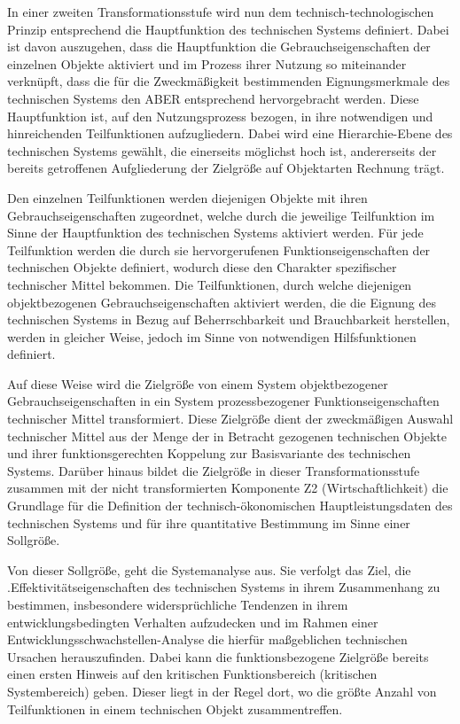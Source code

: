 \documentclass[12pt,a4paper]{article}
\begin{document}
In einer zweiten Transformationsstufe wird nun dem technisch-technologischen
Prinzip entsprechend die Hauptfunktion des technischen Systems
definiert. Dabei ist davon auszugehen, dass die Hauptfunktion die
Gebrauchseigenschaften der einzelnen Objekte aktiviert und im Prozess ihrer
Nutzung so miteinander verknüpft, dass die für die Zweckmäßigkeit bestimmenden
Eignungsmerkmale des technischen Systems den ABER entsprechend hervorgebracht
werden. Diese Hauptfunktion ist, auf den Nutzungsprozess bezogen, in ihre
notwendigen und hinreichenden Teilfunktionen aufzugliedern. Dabei wird eine
Hierarchie-Ebene des technischen Systems gewählt, die einerseits möglichst
hoch ist, andererseits der bereits getroffenen Aufgliederung der Zielgröße auf
Objektarten Rechnung trägt.

Den einzelnen Teilfunktionen werden diejenigen Objekte mit ihren
Gebrauchseigenschaften zugeordnet, welche durch die jeweilige Teilfunktion im
Sinne der Hauptfunktion des technischen Systems aktiviert werden. Für jede
Teilfunktion werden die durch sie hervorgerufenen Funktionseigenschaften der
technischen Objekte definiert, wodurch diese den Charakter spezifischer
technischer Mittel bekommen. Die Teilfunktionen, durch welche diejenigen
objektbezogenen Gebrauchseigenschaften aktiviert werden, die die Eignung des
technischen Systems in Bezug auf Beherrschbarkeit und Brauchbarkeit
herstellen, werden in gleicher Weise, jedoch im Sinne von notwendigen
Hilfsfunktionen definiert.

Auf diese Weise wird die Zielgröße von einem System objektbezogener
Gebrauchseigenschaften in ein System prozessbezogener Funktionseigenschaften
technischer Mittel transformiert. Diese Zielgröße dient der zweckmäßigen
Auswahl technischer Mittel aus der Menge der in Betracht gezogenen technischen
Objekte und ihrer funktionsgerechten Koppelung zur Basisvariante des
technischen Systems. Darüber hinaus bildet die Zielgröße in dieser
Transformationsstufe zusammen mit der nicht transformierten Komponente Z2
(Wirtschaftlichkeit) die Grundlage für die Definition der
technisch-ökonomischen Hauptleistungsdaten des technischen Systems und für
ihre quantitative Bestimmung im Sinne einer Sollgröße.

Von dieser Sollgröße, geht die Systemanalyse aus. Sie verfolgt das Ziel, die
.Effektivitätseigenschaften des technischen Systems in ihrem Zusammenhang zu
bestimmen, insbesondere widersprüchliche Tendenzen in ihrem
entwicklungsbedingten Verhalten aufzudecken und im Rahmen einer
Entwicklungsschwachstellen-Analyse die hierfür maßgeblichen technischen
Ursachen herauszufinden. Dabei kann die funktionsbezogene Zielgröße bereits
einen ersten Hinweis auf den kritischen Funktionsbereich (kritischen
Systembereich) geben. Dieser liegt in der Regel dort, wo die größte Anzahl von
Teilfunktionen in einem technischen Objekt zusammentreffen.
\end{document}
